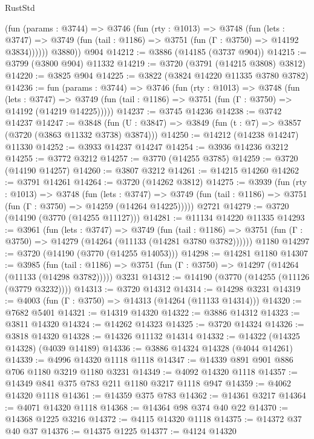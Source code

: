 \begin{lexlean}{RustStd}
\begin{coremodule}
          (fun (params : @3744) =>
          @3746
            (fun (rty : @1013) =>
            @3748
              (fun (lets : @3747) =>
              @3749 (fun (tail : @1186) => @3751 (fun (Γ : @3750) => @14192 @3834))))))
        @3880))
    @904
@14212 := @3886 (@14185 (@3737 @904))
@14215 := @3799 (@3800 @904) @11332
@14219 := @3720 (@3791 (@14215 @3808) @3812)
@14220 := @3825 @904
@14225 := @3822 (@3824 @14220 @11335 @3780 @3782)
@14236 := fun (params : @3744) =>
  @3746
    (fun (rty : @1013) =>
    @3748
      (fun (lets : @3747) =>
      @3749 (fun (tail : @1186) => @3751 (fun (Γ : @3750) => @14192 (@14219 @14225)))))
@14237 := @3745 @14236
@14238 := @3742 @14237
@14247 := @3848
    (fun (U : @3847) => @3849 (fun (t : @7) => @3857 (@3720 (@3863 @11332 @3738) @3874)))
@14250 := @14212 (@14238 @14247) @11330
@14252 := @3933 @14237 @14247
@14254 := @3936 @14236 @3212
@14255 := @3772 @3212
@14257 := @3770 (@14255 @3785)
@14259 := @3720 (@14190 @14257)
@14260 := @3807 @3212
@14261 := @14215 @14260
@14262 := @3791 @14261
@14264 := @3720 (@14262 @3812)
@14275 := @3939
    (fun (rty : @1013) =>
    @3748
      (fun (lets : @3747) =>
      @3749 (fun (tail : @1186) => @3751 (fun (Γ : @3750) => @14259 (@14264 @14225)))))
    @2721
@14279 := @3720 (@14190 (@3770 (@14255 @11127)))
@14281 := @11134 @14220 @11335
@14293 := @3961
    (fun (lets : @3747) =>
    @3749
      (fun (tail : @1186) =>
      @3751 (fun (Γ : @3750) => @14279 (@14264 (@11133 (@14281 @3780 @3782))))))
    @1180
@14297 := @3720 (@14190 (@3770 (@14255 @14053)))
@14298 := @14281 @1180
@14307 := @3985
    (fun (tail : @1186) => @3751 (fun (Γ : @3750) => @14297 (@14264 (@11133 (@14298 @3782)))))
    @3231
@14312 := @14190 (@3770 (@14255 (@11126 (@3779 @3232))))
@14313 := @3720 @14312
@14314 := @14298 @3231
@14319 := @4003 (fun (Γ : @3750) => @14313 (@14264 (@11133 @14314)))
@14320 := @7682 @5401
@14321 := @14319 @14320
@14322 := @3886 @14312
@14323 := @3811 @14320
@14324 := @14262 @14323
@14325 := @3720 @14324
@14326 := @3818 @14320
@14328 := @14326 @11132 @14314
@14332 := @14322 (@14325 @14328) (@4039 @14189)
@14336 := @3886 @14324 @14328 (@4044 @14261)
@14339 := @4996 @14320 @1118 @1118
@14347 := @14339 @891 @901 @886 @706 @1180 @3219 @1180 @3231
@14349 := @4092 @14320 @1118
@14357 := @14349 @841 @375 @783 @211 @1180 @3217 @1118 @947
@14359 := @4062 @14320 @1118
@14361 := @14359 @375 @783
@14362 := @14361 @3217
@14364 := @4071 @14320 @1118
@14368 := @14364 @98 @374 @40 @22
@14370 := @14368 @1225 @3216
@14372 := @4115 @14320 @1118
@14375 := @14372 @37 @40 @37
@14376 := @14375 @1225
@14377 := @4124 @14320

\end{coremodule}
\end{lexlean}
